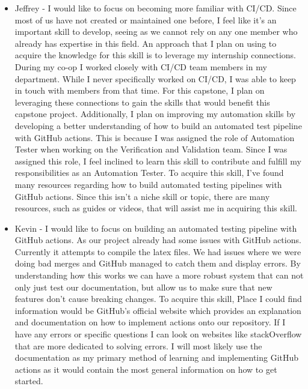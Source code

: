 \documentclass[12pt, titlepage]{article}
\begin{document}
\begin{enumerate}
\begin{itemize}
    Practicing writing unit tests different components is also a great way to
    learn this skill. By picking a real react project and using the outlined
    tools to write tests for its components, I can gain hands-on experience
    and understand how to effectively test the components of our own project.
    If time permits, I will attempt to approach learning this skill through
    practicing writing the unit tests, as I believe applying the knowledge in a
    practical manner will help me understand the concepts better than just
    researching them.
    \item Jeffrey - I would like to focus on becoming more
    familiar with CI/CD. Since most of us have not created or
    maintained one before, I feel like it's an important
    skill to develop, seeing as we cannot rely on any
    one member who already has expertise in this field. An approach
    that I plan on using to acquire the knowledge for this
    skill is to leverage my internship connections. During my co-op
    I worked closely with CI/CD team members in my department.
    While I never specifically worked on CI/CD, I was able to keep
    in touch with members from that time. For this capstone, I plan
    on leveraging these connections to gain the skills
    that would benefit this capstone project. Additionally, I plan
    on improving my automation skills by developing a better
    understanding of how to build an automated test pipeline with
    GitHub actions. This is because I was assigned the role of
    Automation Tester when working on the Verification and
    Validation team. Since I was assigned this role,
    I feel inclined to learn this skill to contribute and fulfill
    my responsibilities as an Automation Tester. To acquire this
    skill, I've found many resources regarding how to build
    automated testing pipelines with GitHub actions. Since this
    isn't a niche skill or topic, there are many resources, such as
    guides or videos, that will assist me in acquiring this skill.
    \item Kevin - I would like to focus on building an automated testing pipeline
     with GitHub actions. As our project already had some issues with GitHub
      actions. Currently it attempts to compile the latex files. We had issues
      where we were doing bad merges and GitHub managed to catch them and display
       errors. By understanding how this works we can have a more robust system
       that can not only just test our documentation, but allow us to make sure
       that new features don't cause breaking changes. To acquire this skill,
       Place I could find information would be GitHub's official website which
       provides an explanation and documentation on how to implement actions onto
       our repository. If I have any errors or specific questions I can look on
       websites like stackOverflow that are more dedicated to solving errors.
       I will most likely use the documentation as my primary method of learning
       and implementing GitHub actions as it would contain the most general
       information on how to get started.
  \end{itemize}
\end{enumerate}
\end{document}
